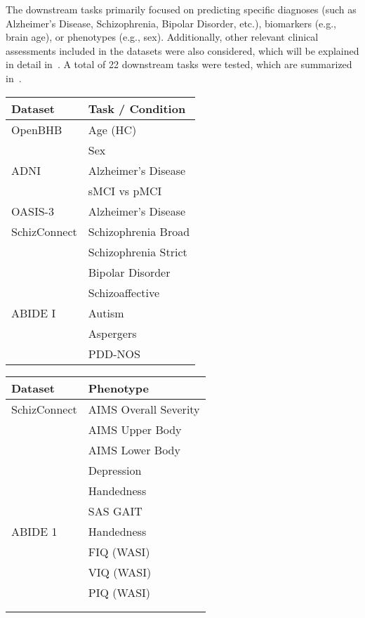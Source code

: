 The downstream tasks primarily focused on predicting specific diagnoses (such as
Alzheimer's Disease, Schizophrenia, Bipolar Disorder, etc.), biomarkers (e.g.,
brain age), or phenotypes (e.g., sex). Additionally, other relevant clinical
assessments included in the datasets were also considered, which will be
explained in detail in~. A total of 22 downstream tasks
were tested, which are summarized in~.
\begin{table*}[h]
    \centering
    \caption[Downstream Tasks Summary]{Summary of downstream tasks (12) and
    clinical assessment scores (10) considered in the study.}
    \begin{tabular}{l l}
    \toprule
    \textbf{Dataset} & \textbf{Task / Condition} \\
    \midrule
    OpenBHB & Age (HC)   \\
            & Sex   \\
    ADNI    & Alzheimer's Disease \\
            & sMCI vs pMCI \\
    OASIS-3 & Alzheimer's Disease \\
    SchizConnect & Schizophrenia Broad \\
                 & Schizophrenia Strict \\
                 & Bipolar Disorder \\
                 & Schizoaffective \\
    ABIDE I & Autism \\
            & Aspergers \\
            & PDD-NOS \\
    \bottomrule
    \end{tabular}
    \begin{tabular}{l l}
    \toprule
    \textbf{Dataset} & \textbf{Phenotype}  \\
    \midrule
    SchizConnect  & AIMS Overall Severity  \\
                  & AIMS Upper Body \\
                  & AIMS Lower Body \\
                  & Depression \\
                  & Handedness \\
                  & SAS GAIT \\
    ABIDE 1 & Handedness \\
            & FIQ (WASI)\\
            & VIQ (WASI) \\
            & PIQ (WASI) \\
    & \\
    & \\
    \bottomrule
    \end{tabular}
\end{table*}
